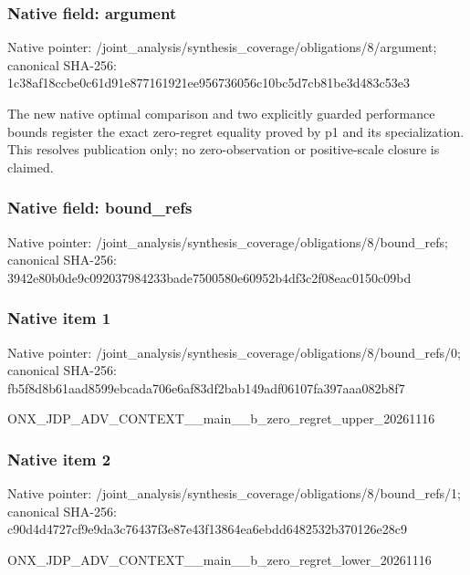 \documentclass[10pt,a4paper]{article}
\begin{document}
\subsubsection{Native field: argument}
Native pointer: /joint\_\allowbreak{}analysis/synthesis\_\allowbreak{}coverage/obligations/8/argument; canonical SHA-256: 1c38af18ccbe0c61d91e877161921ee956736056c10bc5d7cb81be3d483c53e3

\begingroup\raggedright\sloppy The new native optimal comparison and two explicitly guarded performance bounds register the exact zero-regret equality proved by p1 and its specialization. This resolves publication only;\allowbreak{} no zero-observation or positive-scale closure is claimed.\par\endgroup

\subsubsection{Native field: bound\_\allowbreak{}refs}
Native pointer: /joint\_\allowbreak{}analysis/synthesis\_\allowbreak{}coverage/obligations/8/bound\_\allowbreak{}refs; canonical SHA-256: 3942e80b0de9c092037984233bade7500580e60952b4df3c2f08eac0150c09bd

\subsubsection{Native item 1}
Native pointer: /joint\_\allowbreak{}analysis/synthesis\_\allowbreak{}coverage/obligations/8/bound\_\allowbreak{}refs/0; canonical SHA-256: fb5f8d8b61aad8599ebcada706e6af83df2bab149adf06107fa397aaa082b8f7

\begingroup\raggedright\sloppy ONX\_\allowbreak{}JDP\_\allowbreak{}ADV\_\allowbreak{}CONTEXT\_\allowbreak{}\_\allowbreak{}main\_\allowbreak{}\_\allowbreak{}b\_\allowbreak{}zero\_\allowbreak{}regret\_\allowbreak{}upper\_\allowbreak{}20261116\par\endgroup

\subsubsection{Native item 2}
Native pointer: /joint\_\allowbreak{}analysis/synthesis\_\allowbreak{}coverage/obligations/8/bound\_\allowbreak{}refs/1; canonical SHA-256: c90d4d4727cf9e9da3c76437f3e87e43f13864ea6ebdd6482532b370126e28c9

\begingroup\raggedright\sloppy ONX\_\allowbreak{}JDP\_\allowbreak{}ADV\_\allowbreak{}CONTEXT\_\allowbreak{}\_\allowbreak{}main\_\allowbreak{}\_\allowbreak{}b\_\allowbreak{}zero\_\allowbreak{}regret\_\allowbreak{}lower\_\allowbreak{}20261116\par\endgroup
\end{document}
